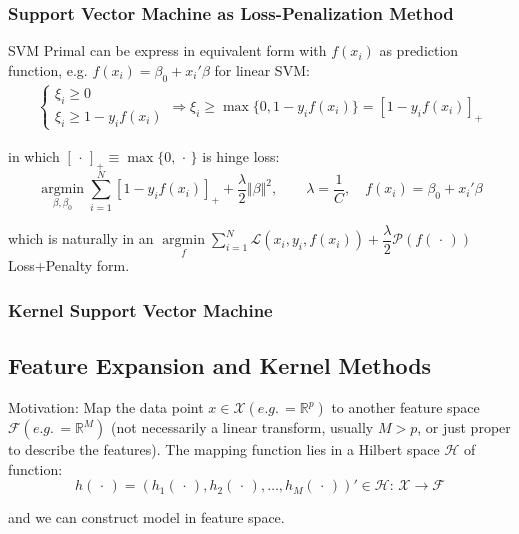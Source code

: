 \subsubsection{Support Vector Machine as Loss-Penalization Method}
    SVM Primal can be express in equivalent form with $ f(x_i) $ as prediction function, e.g. $ f(x_i)=\beta _0+x_i'\beta  $ for linear SVM:
    \begin{align}
        \begin{cases}
            \xi _i\geq 0\\
            \xi _i\geq 1-y_if(x_i)
        \end{cases} \Rightarrow \xi _i\geq \max\{0,1-y_if(x_i)\}= [1-y_if(x_i)]_+
    \end{align}
    
    in which $ [\,\cdot\,]_+\equiv \max\{0,\,\cdot\,\} $ is hinge loss:
    \[
        \mathop{\arg\min}\limits_{\beta ,\beta _0}\sum_{i=1}^N\left[1-y_if(x_i)\right]_++\dfrac{\lambda }{2}\Vert \beta  \Vert ^2,\qquad \lambda =\dfrac{1}{C} ,\quad f(x_i)=\beta _0+x_i'\beta 
    \]
    
    which is naturally in an $ \mathop{\arg\min}\limits_{f}\sum_{i=1}^N\mathcal{L}\left(x_i,y_i,f(x_i)\right)+\dfrac{\lambda }{2}\mathcal{P}(f(\,\cdot\,))  $ Loss+Penalty form.  








\subsubsection{Kernel Support Vector Machine}




\subsection{Feature Expansion and Kernel Methods}
    Motivation: Map the data point $ x\in \mathcal{X}(e.g.\,=\mathbb{R}^p) $ to another feature space $ \mathcal{F}(e.g.\,=\mathbb{R}^M) $ (not necessarily a linear transform, usually $ M>p $, or just proper to describe the features). The mapping function lies in a Hilbert space $ \mathcal{H} $ of function:
    \[
        h(\,\cdot\,)=\left(h_1(\,\cdot\,),h_2(\,\cdot\,),\ldots,h_M(\,\cdot\,)\right)'\in \mathcal{H}:\, \mathcal{X} \to \mathcal{F}
    \]
    
    and we can construct model in feature space.    
    
